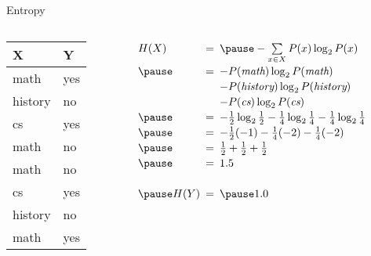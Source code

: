 \documentclass[14pt]{beamer}
\begin{document}
\begin{frame}{Entropy}
\begin{columns}
\begin{column}{0.25\textwidth}
\begin{tabular}{ll}
X       & Y   \\
\hline
math    & yes \\
history & no  \\
cs      & yes \\
math    & no  \\
math    & no  \\
cs      & yes \\
history & no  \\
math    & yes \\
\end{tabular}
\end{column}
\begin{column}{0.7\textwidth}
\pause
$
\extrarowheight=2pt
\setlength{\arraycolsep}{0.25em}
\begin{array}{ l l l }
H(X)        & = & \pause -\sum\limits_{x \in X}P(x)\log_2 P(x) \\
     \pause & = & -P(\textit{math})\log_2 P(\textit{math}) \\
            &   & -P(\textit{history})\log_2 P(\textit{history}) \\
            &   & -P(\textit{cs})\log_2 P(\textit{cs}) \\
     \pause & = & -\frac{1}{2}\log_2\frac{1}{2} 
                  -\frac{1}{4}\log_2\frac{1}{4}
                  -\frac{1}{4}\log_2\frac{1}{4} \\
     \pause & = & -\frac{1}{2}(-1) - \frac{1}{4}(-2) - \frac{1}{4}(-2) \\
     \pause & = & \frac{1}{2} + \frac{1}{2} + \frac{1}{2} \\
     \pause & = & 1.5 \\
\\
\pause
H(Y)        & = & \pause 1.0 \\
\end{array}
$
\end{column}
\end{columns}
\end{frame}
\end{document}

